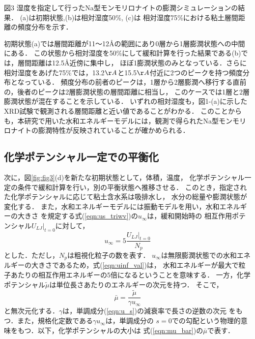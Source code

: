 図3
湿度を指定して行ったNa型モンモリロナイトの膨潤シミュレーションの結果．
(a)は初期状態,(b)は相対湿度50$\%$, (c)は 相対湿度75$\%$における粘土層間距離の頻度分布を示す．

初期状態(a)では層間距離が11〜12Åの範囲にあり0層から1層膨潤状態への中間にある．
この状態から相対湿度を50$\%$にして緩和計算を行った結果である(b)では，層間距離は12.5Å近傍に集中し，
ほぼ1膨潤状態のみとなっている．さらに相対湿度をあげた75$\%$では，13.2$\AA$と15.5$\AA$付近に2つのピークを持つ頻度分布となっている．
頻度分布の前者のピークは，1層から2層膨潤へ移行する直前の，後者のピークは2層膨潤状態の層間距離に相当し，
このケースでは1層と2層膨潤状態が混在することを示している．
いずれの相対湿度も，図1-(a)に示したXRD試験で観測される層間距離と近い値であることがわかる．
このことからも，本研究で用いた水和エネルギーモデルには，観測で得られたNa型モンモリロナイトの膨潤特性が反映されていることが確かめられる．
\subsection{化学ポテンシャル一定での平衡化}
次に，図\ref{fig:fig3}(d)を新たな初期状態として，体積，温度，
化学ポテンシャル一定の条件で緩和計算を行い，別の平衡状態へ推移させる．
このとき，指定された化学ポテンシャルに応じて粘土含水系は吸排水し，
水分の総量や膨潤状態が変化する．
また，水和エネルギーモデルには振動モデルを用い，水和エネルギーの大きさ
を規定する式(\ref{eqn:us_triwv})の$u_{\infty}$は，緩和開始時の
相互作用ポテンシャル$\left. U_{LJ}\right|_{t=0}$に対して，
\begin{equation}
	u_{\infty}=5\frac{\left.U_{LJ}\right|_{t=0}}{N_p}
	\label{eqn:uinf_val}
\end{equation}
とした．ただし，$N_p$は粗視化粒子の数を表す．
$u_{\infty}$は無限膨潤状態での水和エネルギーの大きさであるため，式(\ref{eqn:uinf_val})は，
水和エネルギーが最大で粒子あたりの相互作用エネルギーの5倍になるということを意味する．
一方，化学ポテンシャル$\tilde \mu$は単位長さあたりのエネルギーの次元を持つ．
そこで，
\begin{equation}
	\bar \mu = \frac{\tilde \mu }{\gamma u_{\infty}}
	\label{eqn:mu_bar}
\end{equation}
と無次元化する．$\gamma$は，単調成分(\ref{eqn:u_s})の減衰率で長さの逆数の次元
をもつ．また，規格化定数である$\gamma u_\infty$は，単調成分の
$s=0$での勾配という物理的意味をもつ．以下，化学ポテンシャルの大小は
式(\ref{eqn:mu_bar})の$\bar \mu$で表す．

